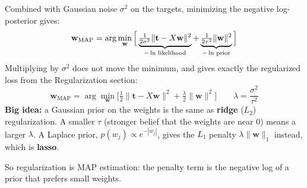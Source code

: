 \begin{keeptogether}
Combined with Gaussian noise $\sigma^2$ on the targets, minimizing the negative log-posterior gives:
\[
\mathbf{w}_{\text{MAP}} = \arg\min_{\mathbf{w}} \Big[\underbrace{\tfrac{1}{2\sigma^2}\|\mathbf{t} - X\mathbf{w}\|^2}_{\makebox[0pt]{\scriptsize \ensuremath{-\ln} likelihood}} + \underbrace{\tfrac{1}{2\tau^2}\|\mathbf{w}\|^2}_{\makebox[0pt]{\scriptsize \ensuremath{-\ln} prior}}\Big]
\]
Multiplying by $\sigma^2$ does not move the minimum, and gives exactly the regularized loss from the Regularization section:
\[
\mathbf{w}_{\text{MAP}} = \arg\min_{\mathbf{w}} \Big[\tfrac{1}{2}\|\mathbf{t} - X\mathbf{w}\|^2 + \tfrac{\lambda}{2}\|\mathbf{w}\|^2\Big]
\qquad \lambda = \frac{\sigma^2}{\tau^2}
\]
\textbf{Big idea:} a Gaussian prior on the weights is the same as \textbf{ridge} ($L_2$) regularization. A smaller $\tau$ (stronger belief that the weights are near 0) means a larger $\lambda$. A Laplace prior, $p(w_j) \propto e^{-|w_j|}$, gives the $L_1$ penalty $\lambda\|\mathbf{w}\|_1$ instead, which is \textbf{lasso}.
\end{keeptogether}

So regularization is MAP estimation: the penalty term is the negative log of a prior that prefers small weights.